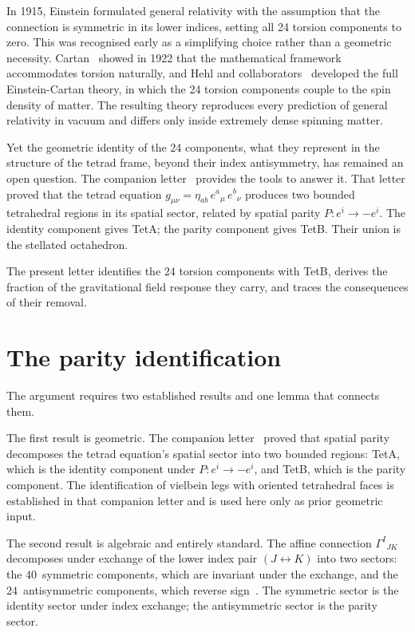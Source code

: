 \documentclass[twocolumn]{iopjournal}
\begin{document}
In 1915, Einstein formulated general relativity with the
assumption that the connection is symmetric in its lower
indices, setting all 24 torsion components to zero. This was
recognised early as a simplifying choice rather than a geometric
necessity. Cartan~\cite{Cartan1922} showed in 1922 that the
mathematical framework
accommodates torsion naturally, and Hehl and
collaborators~\cite{Hehl1976} developed the full Einstein-Cartan
theory, in which the 24 torsion components couple to the spin
density of matter. The resulting theory reproduces every
prediction of general relativity in vacuum and differs only
inside extremely dense spinning matter.

Yet the geometric identity of the 24 components, what they
represent in the structure of the tetrad frame, beyond their
index antisymmetry, has remained an open question. The
companion letter~\cite{Nelson2026a} provides the tools to
answer it. That letter proved that the tetrad equation
$g_{\mu\nu} = \eta_{ab}\,e^a{}_\mu\,e^b{}_\nu$ produces two
bounded tetrahedral regions in its spatial sector, related by
spatial parity $P: e^i \to -e^i$. The identity component gives
TetA; the parity component gives TetB. Their union is the
stellated octahedron.

The present letter identifies the 24 torsion components with
TetB, derives the fraction of the gravitational field response
they carry, and traces the consequences of their removal.


\section{The parity identification}

The argument requires two established results and one lemma
that connects them.

The first result is geometric. The companion
letter~\cite{Nelson2026a} proved that spatial parity
decomposes the tetrad equation's spatial sector into two bounded
regions: TetA, which is the identity component under
$P: e^i \to -e^i$, and TetB, which is the parity component.
The identification of vielbein legs with oriented tetrahedral
faces is established in that companion letter and is used here
only as prior geometric input.

The second result is algebraic and entirely standard. The affine
connection $\Gamma^I{}_{JK}$ decomposes under exchange of the
lower index pair $(J \leftrightarrow K)$ into two sectors: the
40~symmetric components, which are invariant under the exchange,
and the 24~antisymmetric components, which reverse
sign~\cite{MTW,Hehl1976}. The symmetric sector is the identity
sector under index exchange; the antisymmetric sector is the
parity sector.
\end{document}
